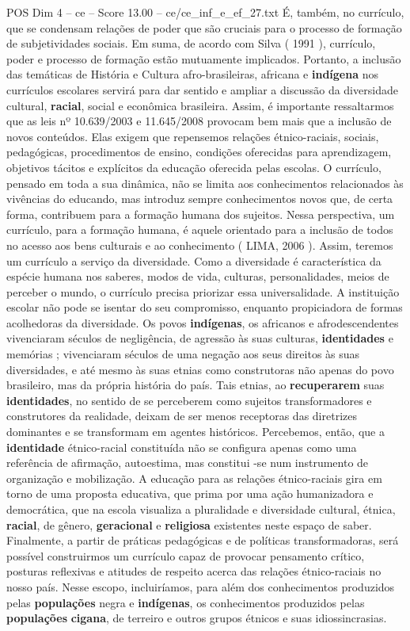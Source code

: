 \begin{textsample}{POS Dim 4 – ce – Score 13.00 – ce/ce\_inf\_e\_ef\_27.txt}
É, também, no currículo, que se condensam relações de poder que são cruciais para o processo de formação de subjetividades sociais.
Em suma, de acordo com Silva ( 1991 ), currículo, poder e processo de formação estão mutuamente implicados.
Portanto, a inclusão das temáticas de História e Cultura afro-brasileiras, africana e \textbf{indígena} nos currículos escolares servirá para dar sentido e ampliar a discussão da diversidade cultural, \textbf{racial}, social e econômica brasileira.
Assim, é importante ressaltarmos que as leis nº 10.639/2003 e 11.645/2008 provocam bem mais que a inclusão de novos conteúdos.
Elas exigem que repensemos relações étnico-raciais, sociais, pedagógicas, procedimentos de ensino, condições oferecidas para aprendizagem, objetivos tácitos e explícitos da educação oferecida pelas escolas.
O currículo, pensado em toda a sua dinâmica, não se limita aos conhecimentos relacionados às vivências do educando, mas introduz sempre conhecimentos novos que, de certa forma, contribuem para a formação humana dos sujeitos.
Nessa perspectiva, um currículo, para a formação humana, é aquele orientado para a inclusão de todos no acesso aos bens culturais e ao conhecimento ( LIMA, 2006 ).
Assim, teremos um currículo a serviço da diversidade.
Como a diversidade é característica da espécie humana nos saberes, modos de vida, culturas, personalidades, meios de perceber o mundo, o currículo precisa priorizar essa universalidade.
A instituição escolar não pode se isentar do seu compromisso, enquanto propiciadora de formas acolhedoras da diversidade.
Os povos \textbf{indígenas}, os africanos e afrodescendentes vivenciaram séculos de negligência, de agressão às suas culturas, \textbf{identidades} e memórias ; vivenciaram séculos de uma negação aos seus direitos às suas diversidades, e até mesmo às suas etnias como construtoras não apenas do povo brasileiro, mas da própria história do país.
Tais etnias, ao \textbf{recuperarem} suas \textbf{identidades}, no sentido de se perceberem como sujeitos transformadores e construtores da realidade, deixam de ser menos receptoras das diretrizes dominantes e se transformam em agentes históricos.
Percebemos, então, que a \textbf{identidade} étnico-racial constituída não se configura apenas como uma referência de afirmação, autoestima, mas constitui -se num instrumento de organização e mobilização.
A educação para as relações étnico-raciais gira em torno de uma proposta educativa, que prima por uma ação humanizadora e democrática, que na escola visualiza a pluralidade e diversidade cultural, étnica, \textbf{racial}, de gênero, \textbf{geracional} e \textbf{religiosa} existentes neste espaço de saber.
Finalmente, a partir de práticas pedagógicas e de políticas transformadoras, será possível construirmos um currículo capaz de provocar pensamento crítico, posturas reflexivas e atitudes de respeito acerca das relações étnico-raciais no nosso país.
Nesse escopo, incluiríamos, para além dos conhecimentos produzidos pelas \textbf{populações} negra e \textbf{indígenas}, os conhecimentos produzidos pelas \textbf{populações} \textbf{cigana}, de terreiro e outros grupos étnicos e suas idiossincrasias.


\end{textsample}
